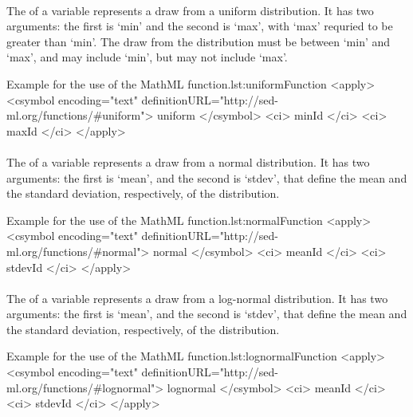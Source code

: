 \begin{blockChanged}
\paragraph*{}
\label{fun:uniform}
The \uniform of a variable represents a draw from a uniform distribution.  It has two arguments:  the first is `min' and the second is `max', with `max' requried to be greater than `min'.  The draw from the distribution must be between `min' and `max', and may include `min', but may not include `max'.
\begin{myXmlLst}{Example for the use of the MathML  function.}{lst:uniformFunction}
<apply>
 	<csymbol encoding="text" definitionURL="http://sed-ml.org/functions/#uniform">
 		uniform
 	</csymbol>
 	<ci> minId </ci>
 	<ci> maxId </ci>
</apply>
\end{myXmlLst}


\paragraph*{}
\label{fun:normal}
The \normal of a variable represents a draw from a normal distribution.  It has two arguments:  the first is `mean', and the second is `stdev', that define the mean and the standard deviation, respectively, of the distribution.
\begin{myXmlLst}{Example for the use of the MathML  function.}{lst:normalFunction}
<apply>
 	<csymbol encoding="text" definitionURL="http://sed-ml.org/functions/#normal">
 		normal
 	</csymbol>
 	<ci> meanId </ci>
 	<ci> stdevId </ci>
</apply>
\end{myXmlLst}


\paragraph*{}
\label{fun:lognormal}
The \lognormal of a variable represents a draw from a log-normal distribution.  It has two arguments:  the first is `mean', and the second is `stdev', that define the mean and the standard deviation, respectively, of the distribution.
\begin{myXmlLst}{Example for the use of the MathML  function.}{lst:lognormalFunction}
<apply>
 	<csymbol encoding="text" definitionURL="http://sed-ml.org/functions/#lognormal">
 		lognormal
 	</csymbol>
 	<ci> meanId </ci>
 	<ci> stdevId </ci>
</apply>
\end{myXmlLst}



\end{blockChanged}

